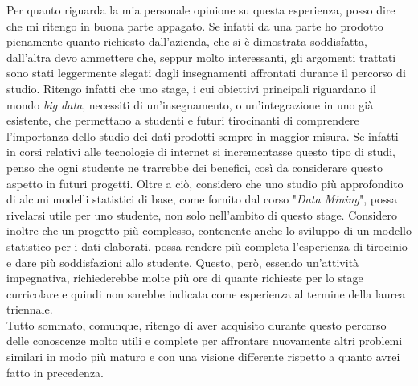 \noindent Per quanto riguarda la mia personale opinione su questa esperienza, posso dire che mi ritengo in buona parte appagato. Se infatti da una parte ho prodotto pienamente quanto richiesto dall'azienda, che si è dimostrata soddisfatta, dall'altra devo ammettere che, seppur molto interessanti, gli argomenti trattati sono stati leggermente slegati dagli insegnamenti affrontati durante il percorso di studio. 
Ritengo infatti che uno stage, i cui obiettivi principali riguardano il mondo \textit{big data}, necessiti di un'insegnamento, o un'integrazione in uno già esistente, che permettano a studenti e futuri tirocinanti di comprendere l'importanza dello studio dei dati prodotti sempre in maggior misura. Se infatti in corsi relativi alle tecnologie di internet si incrementasse questo tipo di studi, penso che ogni studente ne trarrebbe dei benefici, così da considerare questo aspetto in futuri progetti.
Oltre a ciò, considero che uno studio più approfondito di alcuni modelli statistici di base, come fornito dal corso "\textit{Data Mining}", possa rivelarsi utile per uno studente, non solo nell'ambito di questo stage.
Considero inoltre che un progetto più complesso, contenente anche lo sviluppo di un modello statistico per i dati elaborati, possa rendere più completa l'esperienza di tirocinio e dare più soddisfazioni allo studente. Questo, però, essendo un'attività impegnativa, richiederebbe molte più ore di quante richieste per lo stage curricolare e quindi non sarebbe indicata come esperienza al termine della laurea triennale. \\
Tutto sommato, comunque, ritengo di aver acquisito durante questo percorso delle conoscenze molto utili e complete per affrontare nuovamente altri problemi similari in modo più maturo e con una visione differente rispetto a quanto avrei fatto in precedenza.
